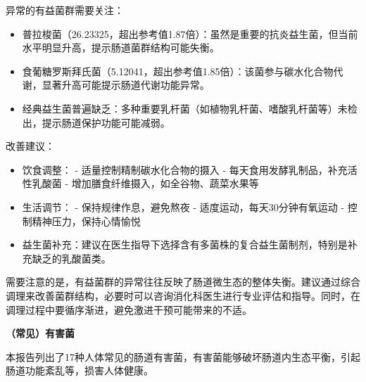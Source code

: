 \documentclass[UTF8]{ctexart}
\begin{document}
\begin{tcolorbox}[
    enhanced,
    colback=gray!3,
    colframe=gray!3,
    arc=3mm,
    boxrule=0pt,
    width=\textwidth,
    top=8pt,
    bottom=8pt
    ]
{\small{\textcolor{customRed}{\faBell}}\quad 异常的有益菌群需要关注：
\begin{itemize}
\item 普拉梭菌（26.23325，超出参考值1.87倍）：虽然是重要的抗炎益生菌，但当前水平明显升高，提示肠道菌群结构可能失衡。
\item 食葡糖罗斯拜氏菌（5.12041，超出参考值1.85倍）：该菌参与碳水化合物代谢，显著升高可能提示肠道代谢功能异常。
\item 经典益生菌普遍缺乏：多种重要乳杆菌（如植物乳杆菌、嗜酸乳杆菌等）未检出，提示肠道保护功能可能减弱。
\end{itemize}

{\textcolor{green!85!black}{\faLightbulb}}\quad 改善建议：
\begin{itemize}
\item 饮食调整：
    - 适量控制精制碳水化合物的摄入
    - 每天食用发酵乳制品，补充活性乳酸菌
    - 增加膳食纤维摄入，如全谷物、蔬菜水果等
\item 生活调节：
    - 保持规律作息，避免熬夜
    - 适度运动，每天30分钟有氧运动
    - 控制精神压力，保持心情愉悦
\item 益生菌补充：建议在医生指导下选择含有多菌株的复合益生菌制剂，特别是补充缺乏的乳酸菌类。
\end{itemize}

需要注意的是，有益菌群的异常往往反映了肠道微生态的整体失衡。建议通过综合调理来改善菌群结构，必要时可以咨询消化科医生进行专业评估和指导。同时，在调理过程中要循序渐进，避免激进干预可能带来的不适。
}
\end{tcolorbox}

\newpage

\begin{tcolorbox}[
    enhanced,
    colback=white,
    colframe=white,
    arc=2mm,
    boxrule=0pt,
    width=\textwidth,
    left=15pt,
    right=15pt,
    top=10pt,
    bottom=10pt,
    drop shadow={
        opacity=0.2,
        color=customTeal
    },
    borderline west={5pt}{0pt}{customTeal}
]
\textcolor{customTeal}{\large\textbf{（常见）有害菌}}
\end{tcolorbox}

\begin{tcolorbox}[
    enhanced,
    colback=customTealBg,
    colframe=customTealBg,
    arc=3mm,
    boxrule=0pt,
    width=\textwidth,
    top=8pt,
    bottom=8pt
]
{\small{\color{customTeal}\faInfoCircle} 本报告列出了17种人体常见的肠道有害菌，有害菌能够破坏肠道内生态平衡，引起肠道功能紊乱等，损害人体健康。
}
\end{tcolorbox}
\end{document}
